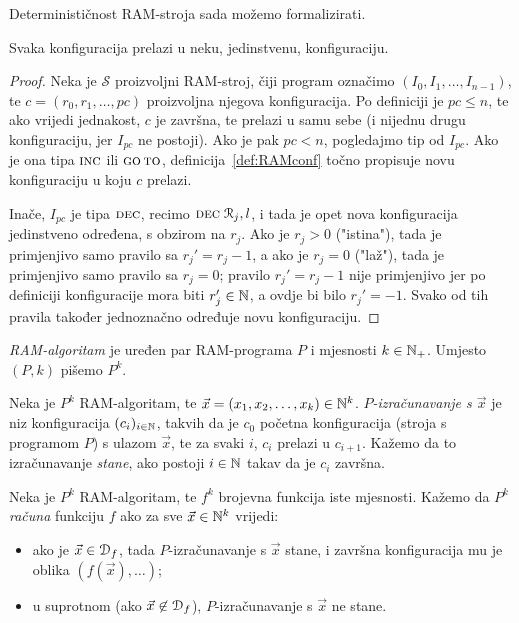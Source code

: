 Determinističnost RAM-stroja sada možemo formalizirati.

\begin{lema}\label{lema:ramdet}
Svaka konfiguracija prelazi u neku, jedinstvenu, konfiguraciju.
\end{lema}
\begin{proof}
Neka je $\mathcal S$ proizvoljni RAM-stroj, čiji program označimo  $(I_0, I_1,\dotsc, I_{n-1})$, te $c=(r_0,r_1,\dotsc,pc)$ proizvoljna njegova konfiguracija. Po definiciji je $pc\le n$, te ako vrijedi jednakost, $c$ je završna, te prelazi u samu sebe (i nijednu drugu konfiguraciju, jer $I_{pc}$ ne postoji). Ako je pak $pc<n$, pogledajmo tip od $I_{pc}$. Ako je ona tipa $\textsc{inc}$ ili $\textsc{go\,to}$, definicija~\ref{def:RAMconf} točno propisuje novu konfiguraciju u koju $c$ prelazi.

Inače, $I_{pc}$ je tipa $\textsc{dec}$, recimo $\textsc{dec}\;\mathcal R_{j},l$, i tada je opet nova konfiguracija jedinstveno određena, s obzirom na $r_j$. Ako je $r_j>0$ ("istina"), tada je primjenjivo samo pravilo sa $r_j'=r_j-1$, a ako je $r_j=0$ ("laž"), tada je primjenjivo samo pravilo sa $r_j=0$; pravilo $r_j'=r_j-1$ nije primjenjivo jer po definiciji konfiguracije mora biti $r_j'\in{\mathbb N}$, a ovdje bi bilo $r_j'=-1$. Svako od tih pravila također jednoznačno određuje novu konfiguraciju.
\end{proof}

\begin{definicija}\label{def:compute}
\emph{RAM-algoritam} je uređen par RAM-programa $P$ i mjesnosti $k\in{\mathbb N}_+$. Umjesto $(P,k)$ pišemo $P^k$.

Neka je $P^k$ RAM-algoritam, te $\vec x=(x_1,x_2,\dotsc,x_k)\in{\mathbb N}^k$. \emph{$P$\!-izračunavanje s $\vec x$} je niz konfiguracija $(c_i)_{i\in{\mathbb N}}$, takvih da je $c_0$ početna konfiguracija (stroja s programom $P$) s ulazom $\vec x$, te za svaki $i$, $c_i$ prelazi u $c_{i+1}$. Kažemo da to izračunavanje \emph{stane}, ako postoji $i\in{\mathbb N}$ takav da je $c_i$ završna.

Neka je $P^k$ RAM-algoritam, te $f^k$ brojevna funkcija iste mjesnosti. Kažemo da $P^k$
\emph{računa} funkciju $f$ ako za sve $\vec x\in{\mathbb N}^k$ vrijedi:
\begin{itemize}
    \item ako  je $\vec x\in \mathcal D_{f}$, tada $P$-izračunavanje s $\vec x$ stane, i završna konfiguracija mu je oblika $(f(\vec x),\dotsc)$;
    \item u suprotnom (ako $\vec x\not\in\mathcal D_{f}$), $P$-izračunavanje s $\vec x$ ne stane.\qedhere
\end{itemize}
\end{definicija}

